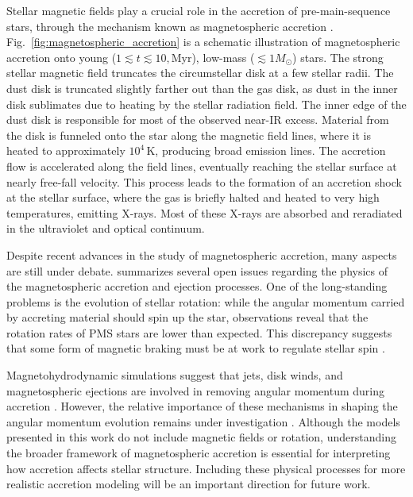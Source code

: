\documentclass[12pt,a4paper]{article}
\newcommand{\mr}{\mathrm}
\begin{document}
Stellar magnetic fields play a crucial role in the accretion of pre-main-sequence stars, through the mechanism known as magnetospheric accretion \parencite[See, for example,][for a review]{HartmannEtAl2016}. Fig.~\ref{fig:magnetospheric_accretion} is a schematic illustration of magnetospheric accretion onto young ($1 \lesssim t \lesssim 10,\mr{Myr}$), low-mass ($\lesssim 1 M_\odot$) stars. The strong stellar magnetic field truncates the circumstellar disk at a few stellar radii. The dust disk is truncated slightly farther out than the gas disk, as dust in the inner disk sublimates due to heating by the stellar radiation field. The inner edge of the dust disk is responsible for most of the observed near-IR excess. Material from the disk is funneled onto the star along the magnetic field lines, where it is heated to approximately $10^4\,\mr{K}$, producing broad emission lines. The accretion flow is accelerated along the field lines, eventually reaching the stellar surface at nearly free-fall velocity. This process leads to the formation of an accretion shock at the stellar surface, where the gas is briefly halted and heated to very high temperatures, emitting X-rays. Most of these X-rays are absorbed and reradiated in the ultraviolet and optical continuum.

Despite recent advances in the study of magnetospheric accretion, many aspects are still under debate. \textcite{Bouvier2014} summarizes several open issues regarding the physics of the magnetospheric accretion and ejection processes. One of the long-standing problems is the evolution of stellar rotation: while the angular momentum carried by accreting material should spin up the star, observations reveal that the rotation rates of PMS stars are lower than expected. This discrepancy suggests that some form of magnetic braking must be at work to regulate stellar spin \parencite[e.g.,][]{HerbstEtAl2007}.

Magnetohydrodynamic simulations suggest that jets, disk winds, and magnetospheric ejections are involved in removing angular momentum during accretion \parencite[e.g.,][]{RomanovaEtAl2004,LiiEtAl2014,IrelandEtAl2020}. However, the relative importance of these mechanisms in shaping the angular momentum evolution remains under investigation \parencite[e.g.,][]{KunitomoEtAl2017}. Although the models presented in this work do not include magnetic fields or rotation, understanding the broader framework of magnetospheric accretion is essential for interpreting how accretion affects stellar structure. Including these physical processes for more realistic accretion modeling will be an important direction for future work.
\end{document}
